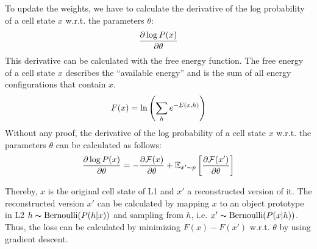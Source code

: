 To update the weights, we have to calculate the derivative of the log probability of a cell state $x$ w.r.t. the parameters $\theta$:
\begin{align}\eqlbl{l2_energy7}
	\frac{\partial \log P(x)}{\partial \theta }
\end{align}
This derivative can be calculated with the free energy function. The free energy of a cell state $x$ describes the ``available energy'' and is the sum of all energy configurations that contain $x$.
\begin{align}\eqlbl{l2_energy8}
	F(x) = \ln \left( \sum_h e^{-E(x,h)} \right)
\end{align}
Without any proof, the derivative of the log probability of a cell state $x$ w.r.t. the parameters $\theta$ can be calculated as follows:
\begin{align}\eqlbl{l2_energy9}
	\frac{\partial \log P(x)}{\partial \theta } = - \frac{\partial \mathcal{F}(x)}{\partial \theta} + \mathbb{E}_{x' \sim p} \left[ \frac{\partial \mathcal{F}(x')}{\partial \theta}  \right]
\end{align}

Thereby, $x$ is the original cell state of L1 and $x'$ a reconstructed version of it.
The reconstructed version $x'$ can be calculated by mapping $x$ to an object prototype in L2  $h \thicksim \text{Bernoulli}(P(h | x) )$ and sampling from $h$, i.e. $x' \thicksim \text{Bernoulli}(P(x | h))$.
Thus, the loss can be calculated by minimizing $F(x) - F(x')$ w.r.t. $\theta$ by using gradient descent.





